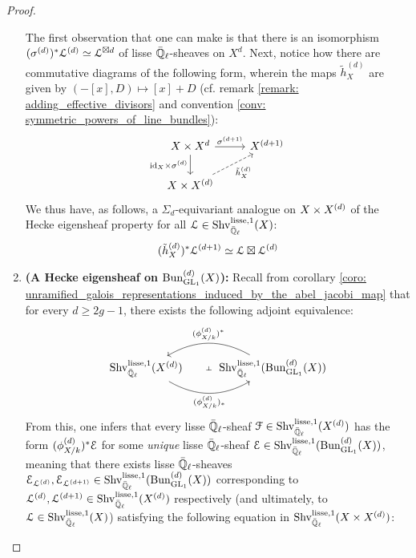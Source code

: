 \begin{proof}
\begin{enumerate}
                        The first observation that one can make is that there is an isomorphism $(\sigma^{(d)})^*\mathcal{L}^{(d)} \simeq \mathcal{L}^{\boxtimes d}$ of lisse $\bar{\mathbb{Q}}_{\ell}$-sheaves on $X^d$. Next, notice how there are commutative diagrams of the following form, wherein the maps $\tilde{h}_X^{(d)}$ are given by $(-[x], D) \mapsto [x] + D$ (cf. remark \ref{remark: adding_effective_divisors} and convention \ref{conv: symmetric_powers_of_line_bundles}):
                            $$
                                \begin{tikzcd}
                                	{X \x X^d} & {X^{(d + 1)}} \\
                                	{X \x X^{(d)}}
                                	\arrow["{\id_X \x \sigma^{(d)}}"', from=1-1, to=2-1]
                                	\arrow["{\tilde{h}_X^{(d)}}"', dashed, from=2-1, to=1-2]
                                	\arrow["{\sigma^{(d + 1)}}", from=1-1, to=1-2]
                                \end{tikzcd}
                            $$
                        We thus have, as follows, a $\Sigma_d$-equivariant analogue on $X \x X^{(d)}$ of the Hecke eigensheaf property for all $\mathcal{L} \in \mathrm{Shv}_{\bar{\mathbb{Q}}_{\ell}}^{\mathrm{lisse}, 1}(X)$:
                            $$(\tilde{h}_X^{(d)})^* \mathcal{L}^{(d + 1)} \simeq \mathcal{L} \boxtimes \mathcal{L}^{(d)}$$
                        \item \textbf{(A Hecke eigensheaf on $\mathrm{Bun}_{\operatorname{GL}_1}^{(d)}(X)$):} Recall from corollary \ref{coro: unramified_galois_representations_induced_by_the_abel_jacobi_map} that for every $d \geq 2g - 1$, there exists the following adjoint equivalence:
                            $$
                                \begin{tikzcd}
                                	{\Shv_{\bar{\Q}_{\ell}}^{\lisse, 1}(X^{(d)})} & {\Shv_{\bar{\Q}_{\ell}}^{\lisse, 1}(\Bun_{\GL_1}^{(d)}(X))}
                                	\arrow[""{name=0, anchor=center, inner sep=0}, "{(\AJ_{X/k}^{(d)})_*}"', bend right, from=1-1, to=1-2]
                                	\arrow[""{name=1, anchor=center, inner sep=0}, "{(\AJ_{X/k}^{(d)})^*}"', bend right, from=1-2, to=1-1]
                                	\arrow["\dashv"{anchor=center, rotate=-90}, draw=none, from=1, to=0]
                                \end{tikzcd}
                            $$ 
                        From this, one infers that every lisse $\bar{\mathbb{Q}}_{\ell}$-sheaf $\mathcal{F} \in \mathrm{Shv}_{\bar{\mathbb{Q}}_{\ell}}^{\mathrm{lisse}, 1}(X^{(d)})$ has the form $(\phi_{X/k}^{(d)})^* \mathcal{E}$ for some \textit{unique} lisse $\bar{\mathbb{Q}}_{\ell}$-sheaf $\mathcal{E} \in \mathrm{Shv}_{\bar{\mathbb{Q}}_{\ell}}^{\mathrm{lisse}, 1}(\mathrm{Bun}_{\operatorname{GL}_1}^{(d)}(X))$, meaning that there exists lisse $\bar{\mathbb{Q}}_{\ell}$-sheaves $\mathcal{E}_{\mathcal{L}^{(d)}}, \mathcal{E}_{\mathcal{L}^{(d + 1)}} \in \mathrm{Shv}_{\bar{\mathbb{Q}}_{\ell}}^{\mathrm{lisse}, 1}(\mathrm{Bun}_{\operatorname{GL}_1}^{(d)}(X))$ corresponding to $\mathcal{L}^{(d)}, \mathcal{L}^{(d + 1)} \in \mathrm{Shv}_{\bar{\mathbb{Q}}_{\ell}}^{\mathrm{lisse}, 1}(X^{(d)})$ respectively (and ultimately, to $\mathcal{L} \in \mathrm{Shv}_{\bar{\mathbb{Q}}_{\ell}}^{\mathrm{lisse}, 1}(X)$) satisfying the following equation in $\Shv_{\bar{\Q}_{\ell}}^{\lisse, 1}(X \x X^{(d)})$:

\end{enumerate}
\end{proof}
